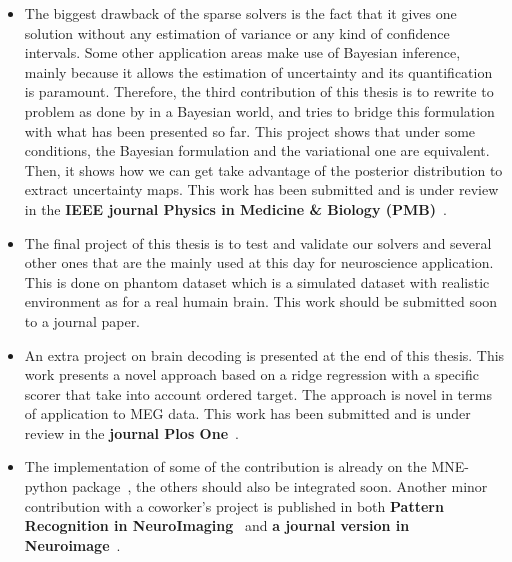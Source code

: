 \begin{itemize}
\item The biggest drawback of the sparse solvers is the fact that it gives one solution without any estimation of variance or any kind of confidence intervals. Some other application areas make use of Bayesian inference, mainly because it allows the estimation of uncertainty and its quantification is paramount. Therefore, the third contribution of this thesis is to rewrite to problem as done by in a Bayesian world, and tries to bridge this formulation with what has been presented so far. This project shows that under some conditions, the Bayesian formulation and the variational one are equivalent. Then, it shows how we can get take advantage of the posterior distribution to extract uncertainty maps. This work has been submitted and is under review in the \textbf{IEEE journal Physics in Medicine \& Biology (PMB)}~\cite{bekhti_arxiv_pmb}.

\item The final project of this thesis is to test and validate our solvers and several other ones that are the mainly used at this day for neuroscience application. This is done on phantom dataset which is a simulated dataset with realistic environment as for a real humain brain. This work should be submitted soon to a journal paper.

\item An extra project on brain decoding is presented at the end of this thesis. This work presents a novel approach based on a ridge regression with a specific scorer that take into account ordered target. The approach is novel in terms of application to MEG data. This work has been submitted and is under review in the \textbf{journal Plos One}~\cite{Bekhti_bioarxiv}.

\item The implementation of some of the contribution is already on the MNE-python package~\cite{MNE}, the others should also be integrated soon. Another minor contribution with a coworker's project is published in both \textbf{Pattern Recognition in NeuroImaging}~\cite{jas_autoreject_prni} and \textbf{a journal version in Neuroimage}~\cite{jas_neuroimage}.
\end{itemize}

